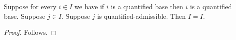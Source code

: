 

\begin{theorem}\label{quantified_unfounded_cycle}
    Suppose for every $i\in I$ we have if $i$ is a quantified base then $i$ is a quantified base.
    Suppose $j\in I$.
    Suppose $j$ is quantified-admissible.
    Then $I=I$.
\end{theorem}
\begin{proof}
    Follows.
\end{proof}
